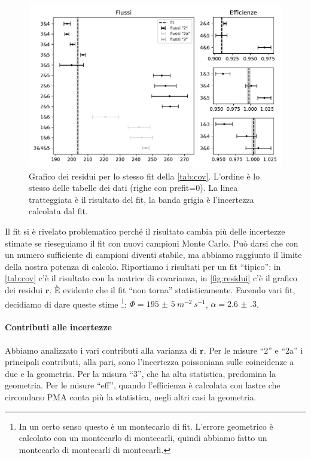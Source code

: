 \begin{figure}
	\centering
	\includegraphics[width=\textwidth]{residuals}
	\caption{\label{fig:residui}
	Grafico dei residui per lo stesso fit della \autoref{tab:cov}.
	L'ordine è lo stesso delle tabelle dei dati (righe con prefit=0).
	La linea tratteggiata è il risultato del fit,
	la banda grigia è l'incertezza calcolata dal fit.}
\end{figure}

Il fit si è rivelato problematico perché il risultato cambia più delle incertezze stimate
se rieseguiamo il fit con nuovi campioni Monte Carlo.
Può darsi che con un numero sufficiente di campioni diventi stabile,
ma abbiamo raggiunto il limite della nostra potenza di calcolo.
Riportiamo i risultati per un fit ``tipico'':
in \autoref{tab:cov} c'è il risultato con la matrice di covarianza,
in \autoref{fig:residui} c'è il grafico dei residui $\mathbf r$.
È evidente che il fit ``non torna'' statisticamente.
Facendo vari fit, decidiamo di dare queste stime%
\footnote{In un certo senso questo è un montecarlo di fit.
L'errore geometrico è calcolato con un montecarlo di montecarli,
quindi abbiamo fatto un montecarlo di montecarli di montecarli.}:
$\Phi=\SI{195(5)}{m^{-2}\,s^{-1}}$, $\alpha=\num{2.6(3)}$.

\paragraph{Contributi alle incertezze}

Abbiamo analizzato i vari contributi alla varianza di $\mathbf r$.
Per le misure ``2'' e ``2a'' i principali contributi, alla pari,
sono l'incertezza poissoniana sulle coincidenze a due e la geometria.
Per la misura ``3'', che ha alta statistica, predomina la geometria.
Per le misure ``eff'', quando l'efficienza è calcolata con lastre che circondano PMA
conta più la statistica, negli altri casi la geometria.

